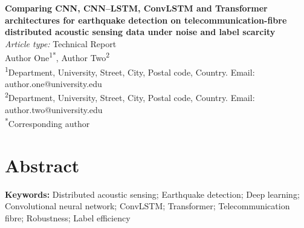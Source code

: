 \documentclass[12pt,a4paper]{article}
\begin{document}
\begin{center}
{\large\bfseries Comparing CNN, CNN--LSTM, ConvLSTM and Transformer architectures for earthquake detection on telecommunication-fibre distributed acoustic sensing data under noise and label scarcity}\\[1.5em]
\textit{Article type:} Technical Report\\[1em]
Author One\textsuperscript{1*}, Author Two\textsuperscript{2}\\[0.5em]
\small
\textsuperscript{1}Department, University, Street, City, Postal code, Country. Email: author.one@university.edu\\
\textsuperscript{2}Department, University, Street, City, Postal code, Country. Email: author.two@university.edu\\
\textsuperscript{*}Corresponding author
\end{center}

\section*{Abstract}

\noindent\textbf{Keywords:} Distributed acoustic sensing; Earthquake detection; Deep learning; Convolutional neural network; ConvLSTM; Transformer; Telecommunication fibre; Robustness; Label efficiency

\clearpage
\end{document}
